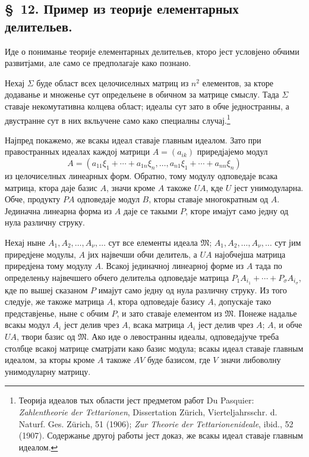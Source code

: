 ﻿\documentclass[11pt]{article}
\newcommand{\ideal}[1]{\mathfrak{#1}}
\begin{document}

\setcounter{footnote}{46}
\subsection*{\S~12. Пример из теорије елементарных делительев.}

Иде о пониманье теорије елементарных делительев, кторо јест условјено обчими развитјами, але само се предполагаје како познано.

Нехај \(\Sigma\) буде област всех целочиселных матриц из \(n^2\) елементов, за кторе додаванье и множенье сут определьене в обичном за матрице смыслу. Тада \(\Sigma\) ставаје некомутативна колцева област; идеалы сут зато в обче једностранны, а двустранне сут в них вкльучене само како специалны случај.\footnote{Теорија идеалов тых области јест предметом работ Du Pasquier: \emph{Zahlentheorie der Tettarionen}, Dissertation Zürich, Vierteljahrsschr. d. Naturf. Ges. Zürich, 51 (1906); \emph{Zur Theorie der Tettarionenideale}, ibid., 52 (1907). Содержанье другој работы јест доказ, же всакы идеал ставаје главным идеалом.}

Најпред покажемо, же всакы идеал ставаје главным идеалом. Зато при правостранных идеалах каждој матрици \(A=(a_{ik})\) приредјајемо модул
\[
 A=(a_{11}\xi_1+\cdots+a_{1n}\xi_n,
 \ldots,
 a_{n1}\xi_1+\cdots+a_{nn}\xi_n)
\]
из целочиселных линеарных форм. Обратно, тому модулу одповедаје всака матрица, ктора даје базис \(A\), значи кроме \(A\) такоже \(UA\), кде \(U\) јест унимодуларна. Обче, продукту \(PA\) одповедаје модул \(B\), кторы ставаје многократным од \(A\). Јединачна линеарна форма из \(A\) даје се такыми \(P\), кторе имајут само једну од нула различну струку.

Нехај ныне \(A_1,A_2,\ldots,A_\nu,\ldots\) сут все елементы идеала \(\ideal M\); \(A_1,A_2,\ldots,A_\nu,\ldots\) сут јим приредјене модулы, \(A\) јих највечши обчи делитель, а \(UA\) најобчејша матрица приредјена тому модулу \(A\). Всакој јединачној линеарној форме из \(A\) тада по определеньу највечшего обчего делительа одповедаје матрица \(P_1A_{i_1}+\cdots+P_\sigma A_{i_\sigma}\), кде по вышеј сказаном \(P\) имајут само једну од нула различну струку. Из того следује, же такоже матрица \(A\), ктора одповедаје базису \(A\), допускаје тако представјенье, ныне с обчим \(P\), и зато ставаје елементом из \(\ideal M\). Понеже надалье всакы модул \(A_i\) јест делив чрез \(A\), всака матрица \(A_i\) јест делив чрез \(A\); \(A\), и обче \(UA\), твори базис од \(\ideal M\). Ако иде о левостранны идеалы, одповедајуче треба столбце всакој матрице сматрјати како базис модула; всакы идеал ставаје главным идеалом, за кторы кроме \(A\) такоже \(AV\) буде базисом, где \(V\) значи либоволну унимодуларну матрицу.
\end{document}
